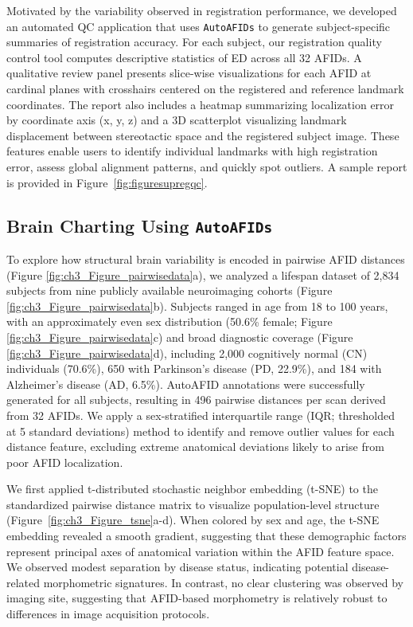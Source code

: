 Motivated by the variability observed in registration performance, we developed an automated QC application that uses \texttt{AutoAFIDs} to generate subject-specific summaries of registration accuracy. For each subject, our registration quality control tool computes descriptive statistics of ED across all 32 AFIDs. A qualitative review panel presents slice-wise visualizations for each AFID at cardinal planes with crosshairs centered on the registered and reference landmark coordinates. The report also includes a heatmap summarizing localization error by coordinate axis (x, y, z) and a 3D scatterplot visualizing landmark displacement between stereotactic space and the registered subject image. These features enable users to identify individual landmarks with high registration error, assess global alignment patterns, and quickly spot outliers. A sample report is provided in Figure~\ref{fig:figuresupregqc}.

\subsection{Brain Charting Using \texttt{AutoAFIDs}}

To explore how structural brain variability is encoded in pairwise AFID distances (Figure \ref{fig:ch3_Figure_pairwisedata}a), we analyzed a lifespan dataset of 2,834 subjects from nine publicly available neuroimaging cohorts (Figure \ref{fig:ch3_Figure_pairwisedata}b). Subjects ranged in age from 18 to 100 years, with an approximately even sex distribution (50.6\% female; Figure \ref{fig:ch3_Figure_pairwisedata}c) and broad diagnostic coverage (Figure \ref{fig:ch3_Figure_pairwisedata}d), including 2,000 cognitively normal (CN) individuals (70.6\%), 650 with Parkinson’s disease (PD, 22.9\%), and 184 with Alzheimer’s disease (AD, 6.5\%). AutoAFID annotations were successfully generated for all subjects, resulting in 496 pairwise distances per scan derived from 32 AFIDs. We apply a sex-stratified interquartile range (IQR; thresholded at 5 standard deviations) method to identify and remove outlier values for each distance feature, excluding extreme anatomical deviations likely to arise from poor AFID localization.

We first applied t-distributed stochastic neighbor embedding (t-SNE) to the standardized pairwise distance matrix to visualize population-level structure (Figure~\ref{fig:ch3_Figure_tsne}a-d). When colored by sex and age, the t-SNE embedding revealed a smooth gradient, suggesting that these demographic factors represent principal axes of anatomical variation within the AFID feature space. We observed modest separation by disease status, indicating potential disease-related morphometric signatures. In contrast, no clear clustering was observed by imaging site, suggesting that AFID-based morphometry is relatively robust to differences in image acquisition protocols.


